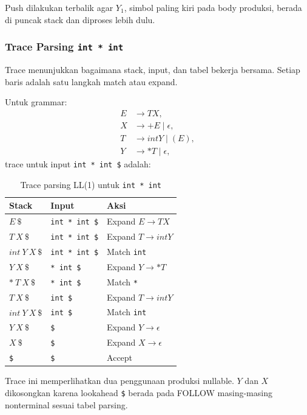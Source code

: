 Push dilakukan terbalik agar $Y_1$, simbol paling kiri pada body produksi, berada di puncak stack dan diproses lebih dulu.

\subsubsection{Trace Parsing \texttt{int * int}}

\begin{jawab}
Trace menunjukkan bagaimana stack, input, dan tabel bekerja bersama. Setiap baris adalah satu langkah match atau expand.
\end{jawab}

Untuk grammar:
\[
\begin{aligned}
E &\rightarrow TX,\\
X &\rightarrow +E \mid \epsilon,\\
T &\rightarrow intY \mid (E),\\
Y &\rightarrow *T \mid \epsilon,
\end{aligned}
\]
trace untuk input \texttt{int * int \$} adalah:

\begin{table}[H]
\centering
\scriptsize
\begin{tabularx}{\textwidth}{|L{0.22\textwidth}|L{0.22\textwidth}|X|}
\hline
\textbf{Stack} & \textbf{Input} & \textbf{Aksi} \\
\hline
$E\ \$$ & \texttt{int * int \$} & Expand $E\rightarrow TX$ \\
\hline
$T\ X\ \$$ & \texttt{int * int \$} & Expand $T\rightarrow intY$ \\
\hline
$int\ Y\ X\ \$$ & \texttt{int * int \$} & Match \texttt{int} \\
\hline
$Y\ X\ \$$ & \texttt{* int \$} & Expand $Y\rightarrow *T$ \\
\hline
$*\ T\ X\ \$$ & \texttt{* int \$} & Match \texttt{*} \\
\hline
$T\ X\ \$$ & \texttt{int \$} & Expand $T\rightarrow intY$ \\
\hline
$int\ Y\ X\ \$$ & \texttt{int \$} & Match \texttt{int} \\
\hline
$Y\ X\ \$$ & \texttt{\$} & Expand $Y\rightarrow\epsilon$ \\
\hline
$X\ \$$ & \texttt{\$} & Expand $X\rightarrow\epsilon$ \\
\hline
\texttt{\$} & \texttt{\$} & Accept \\
\hline
\end{tabularx}
\caption{Trace parsing LL(1) untuk \texttt{int * int}}
\label{tab:trace-ll1-int-times-int}
\end{table}

Trace ini memperlihatkan dua penggunaan produksi nullable. $Y$ dan $X$ dikosongkan karena lookahead \texttt{\$} berada pada FOLLOW masing-masing nonterminal sesuai tabel parsing.
